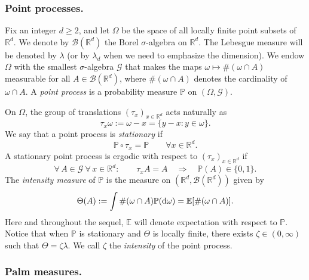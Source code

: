 \documentclass[11pt]{article}
\renewcommand{\d}{{\rm d}}
\newcommand{\R}{\mathbb R}
\newcommand{\E}{\mathbb E}
\renewcommand{\P}{\mathbb P}
\theoremstyle{rem}
\begin{document}
\subsubsection{Point processes.}\label{subsec pointPalm}

Fix an integer $d\geq 2$, and let $\Omega$ be the space of all locally finite
point subsets of $\R^d$. We denote by $\mathcal{B}(\R^d)$ the Borel
$\sigma$-algebra on $\R^d$. The Lebesgue measure will be denoted by $\lambda$
(or by $\lambda_d$ when we need to emphasize the dimension). We endow $\Omega$
with the smallest $\sigma$-algebra $\mathcal{G}$ that makes the maps
$\omega\mapsto \#(\omega\cap A)$ measurable for all
$A\in \mathcal{B}(\R^d)$, where $\#(\omega\cap A)$ denotes the cardinality of
$\omega\cap A$. A \textit{point process} is a probability measure $\P$ on
$(\Omega,\mathcal{G})$.

On $\Omega$, the group of translations $(\tau_x)_{x\in \R^d}$ acts naturally as
\[
\tau_x \omega:=\omega-x = \big\{ y-x  : y\in \omega \big\}.
\]
We say that a point process is {\it stationary} if
\begin{equation}\label{def-stationary}
\P\circ \tau_x = \P\qquad\forall x\in \R^d.
\end{equation}
A stationary point process is ergodic with respect to $(\tau_x)_{x\in \R^d}$
if
\begin{equation}
  \label{eq:erg-def}
 \forall\, A\in \mathcal{G}\  \forall \, x\in
     \R^d : \qquad \tau_x A= A\quad \Longrightarrow \quad \P(A)\in \{0,1\}.
\end{equation}
The \textit{intensity measure} of $\P$ is the measure on
$(\R^d,\mathcal{B}(\R^d))$ given by
\begin{equation}\label{eq:Theta-def}
 \Theta(A):= \int \#(\omega \cap A) \P(\d\omega)= \E[\#(\omega\cap A)].
\end{equation}
Here and throughout the sequel, $\E$ will denote expectation with respect to
$\P$. Notice that when $\P$ is stationary and $\Theta$ is locally finite, there
exists $\zeta\in (0,\infty)$ such that $\Theta=\zeta \lambda$. We call $\zeta$
the \textit{intensity} of the point process.

\subsubsection{Palm measures.}
\end{document}
